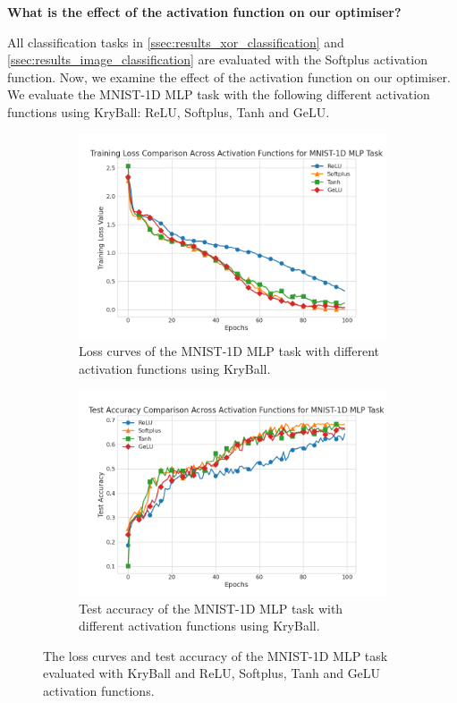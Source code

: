 \textbf{What is the effect of the activation function on our optimiser?}

All classification tasks in \cref{ssec:results_xor_classification} and \cref{ssec:results_image_classification} are evaluated with the Softplus activation function. Now, we examine the effect of the activation function on our optimiser. We evaluate the MNIST-1D MLP task with the following different activation functions using KryBall: ReLU, Softplus, Tanh and GeLU.

\begin{figure}[!t]
    \begin{subfigure}[b]{0.49\linewidth}
        \centering
        \includegraphics[width=\linewidth]{figures/5evals/mnist1d_activation_loss.png}
        \caption{Loss curves of the MNIST-1D MLP task with different activation functions using KryBall.}
        \label{fig:act_loss}
    \end{subfigure}
    \hfill
    \begin{subfigure}[b]{0.49\linewidth}
        \centering
        \includegraphics[width=\linewidth]{figures/5evals/mnist1d_activation_acc.png}
        \caption{Test accuracy of the MNIST-1D MLP task with different activation functions using KryBall.}
        \label{fig:act_acc}
    \end{subfigure}
    \caption{The loss curves and test accuracy of the MNIST-1D MLP task evaluated with KryBall and ReLU, Softplus, Tanh and GeLU activation functions.}
    \label{fig:act_results}
\end{figure}

